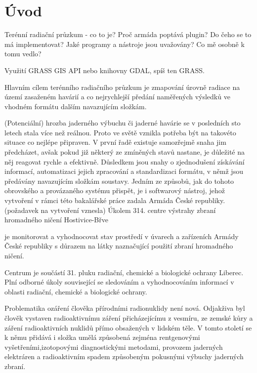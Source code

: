 \chapter{Úvod}
\label{1-uvod}

Terénní radiační průzkum - co to je?
Proč armáda poptává plugin?
Do čeho se to má implementovat?
Jaké programy a nástroje jsou uvažovány?
Co mě osobně k tomu vedlo?

Využití GRASS GIS API nebo knihovny GDAL, spíš ten GRASS. 

Hlavním cílem terénního radiačního průzkum je zmapování úrovně radiace na území zasaženém havárií a co nejrychlejší předání naměřených výsledků ve vhodném formátu dalším navazujícím složkám. 


(Potenciální) hrozba jaderného výbuchu či jaderné havárie se v posledních sto letech stala více než reálnou. Proto ve světě vznikla potřeba být na takovéto situace co nejlépe připraven. V první řadě existuje samozřejmě snaha jim předcházet, avšak pokud již některý ze zmíněných stavů nastane, je důležité na něj reagovat rychle a efektivně. 
Důsledkem jsou snahy o zjednodušení získávání informací, automatizaci jejich zpracování a standardizaci formátu, v němž jsou předávány navazujícím složkám soustavy. Jedním ze způsobů, jak do tohoto obrovského a provázaného systému přispět, je i softwarový nástroj, jehož vytvoření v rámci této bakalářské práce zadala Armáda České republiky. (požadavek na vytvoření vznesla)
Úkolem 314. centre výstrahy zbraní hromadného ničení Hostivice-Břve 


je monitorovat a vyhodnocovat stav prostředí v úvarech a zařízeních Armády České republiky s důrazem na látky naznačující použití zbraní hromadného ničení.

Centrum je součástí 31. pluku radiační, chemické a biologické ochrany Liberec. Plní odborné úkoly související se sledováním a vyhodnocováním informací v oblasti radiační, chemické a biologické ochrany. 


 Problematika ozáření člověka přírodními radionuklidy není nová. Odjakživa byl člověk vystaven radioaktivnímu záření přicházejícímu z vesmíru, ze zemské kůry a záření radioaktivních nuklidů přímo obsažených v lidském těle. V tomto století se k němu přidává i složka umělá způsobená zejména rentgenovými vyšetřeními,izotopovými diagnostickými metodami, provozem jaderných elektráren a radioaktivním spadem způsobeným pokusnými výbuchy jaderných zbraní. 